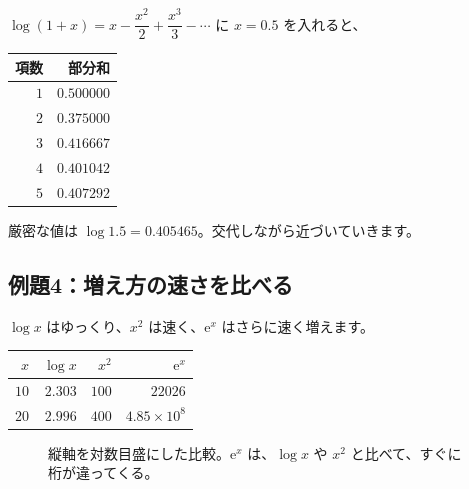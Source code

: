 \documentclass[a4paper,11pt,openany]{ltjsbook}
\newcommand{\ee}{\mathrm{e}}
\begin{document}
$\log(1+x)=x-\dfrac{x^2}{2}+\dfrac{x^3}{3}-\cdots$ に $x=0.5$ を入れると、

\begin{center}
\begin{tabular}{rr}
\toprule
項数 & 部分和\\
\midrule
$1$ & $0.500000$\\
$2$ & $0.375000$\\
$3$ & $0.416667$\\
$4$ & $0.401042$\\
$5$ & $0.407292$\\
\bottomrule
\end{tabular}
\end{center}

厳密な値は $\log1.5=0.405465$。交代しながら近づいていきます。

\subsection*{例題4：増え方の速さを比べる}

$\log x$ はゆっくり、$x^2$ は速く、$\ee^x$ はさらに速く増えます。

\begin{center}
\begin{tabular}{rrrr}
\toprule
$x$ & $\log x$ & $x^2$ & $\ee^x$\\
\midrule
$10$ & $2.303$ & $100$ & $22026$\\
$20$ & $2.996$ & $400$ & $4.85\times10^{8}$\\
\bottomrule
\end{tabular}
\end{center}

\begin{figure}[htbp]
\centering
{}
\caption{縦軸を対数目盛にした比較。$\ee^x$ は、$\log x$ や $x^2$ と比べて、すぐに桁が違ってくる。}
\end{figure}
\end{document}
